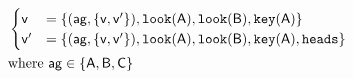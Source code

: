 $
\begin{aligned}
	&\begin{cases}
		\poss{v}&= \bra{
	     	(\agent{ag},\bra{\poss{v}, \poss{v^\prime}}),	\looking{a},
	     	\looking{b},
	     	\haskey{a}%
		}\\
			\poss{v}^\prime&= \bra{
	    	(\agent{ag},\bra{\poss{v}, \poss{v^\prime}}),
	    	\looking{a},
	    	\looking{b},
	    	\haskey{a},
	    	\head%
		}\\
	\end{cases}\\
	&\text{where }  \agent{ag}  \in \bra{\agent{A}, \agent{B}, \agent{C}}
\end{aligned}
$


